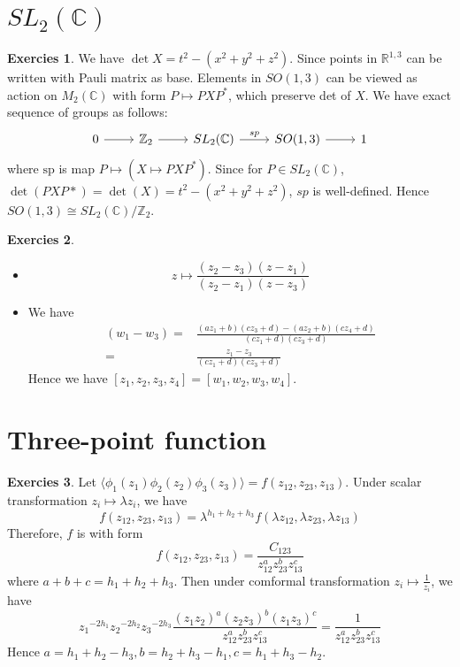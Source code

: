 \documentclass[11pt,a4paper]{article}
\theoremstyle{definition}
\newtheorem{exer}{Exercies}[subsection]
\begin{document}
\section{$SL_2(\mathbb{C})$}
\begin{exer}
	We have $\det X = t^2-(x^2+y^2+z^2)$. Since points in $\mathbb{R}^{1,3}$ can be written with Pauli matrix as base. Elements in $SO(1,3)$ can be viewed as action on $M_2(\mathbb{C})$ with form $P \mapsto PXP^*$, which preserve det of $X$.
	We have exact sequence of groups as follows:
	\[\begin{tikzcd}
		0 \ar[r] &\mathbb{Z}_2 \ar[r] &SL_2(\mathbb{C}) \ar[r,"sp"]&SO(1,3) \ar[r]&1 
	\end{tikzcd}\]
	where $\text{sp}$ is map $P \mapsto (X \mapsto PXP^*)$. Since for $P \in SL_2(\mathbb{C})$, $\det(PXP*) = \det(X) = t^2-(x^2+y^2+z^2)$, $sp$ is well-defined. Hence $SO(1,3) \cong SL_2(\mathbb{C})/\mathbb{Z}_2$.
\end{exer}
\begin{exer}
	\begin{itemize}
		\item \[
		z \mapsto \frac{(z_2 -z_3)(z-z_1)}{(z_2-z_1)(z-z_3)}
		\]
		\item We have
		\[
		\begin{aligned}
		(w_1 -w_3)=&\frac{(az_1+b)(cz_3+d)-(az_2 +b)(cz_4+d)}{(cz_1+d)(cz_3+d)}\\
		=&\frac{z_1-z_3}{(cz_1+d)(cz_3+d)}
		\end{aligned}
		\]
		Hence we have $[z_1,z_2,z_3,z_4]=[w_1,w_2,w_3,w_4]$.
	\end{itemize}
\end{exer}
\section{Three-point function}
\begin{exer}
	Let $\langle\phi_1(z_1)\phi_2(z_2)\phi_3(z_3)\rangle =f(z_{12},z_{23},z_{13})$. Under scalar transformation $z_i \mapsto \lambda z_i$, we have
	\[
	f(z_{12},z_{23},z_{13})=\lambda^{h_1+h_2+h_3}f(\lambda z_{12},\lambda z_{23},\lambda z_{13})
	\]
	Therefore, $f$ is with form
	\[
	f(z_{12},z_{23},z_{13})=\frac{C_{123}}{z_{12}^a z_{23}^b z_{13}^c}
	\]
	where $a+b+c = h_1 +h_2 +h_3$.
	Then under comformal transformation $z_i \mapsto \frac{1}{z_i}$, we have
	\[
	{z_1}^{-2h_1}{z_2}^{-2h_2}{z_3}^{-2h_3} \frac{(z_1z_2)^a(z_2 z_3)^b(z_1z_3)^c}{z_{12}^a z_{23}^b z_{13}^c}= \frac{1}{z_{12}^a z_{23}^b z_{13}^c}
	\]
	Hence $a= h_1 +h_2 -h_3, b=h_2 + h_3 -h_1, c= h_1 +h_3 - h_2$.
\end{exer}
\end{document}

